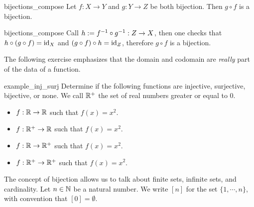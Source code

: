 \begin{clem}{}{bijections_compose}
    Let \( f : X \to Y \) and \( g : Y \to Z \) be both bijection. Then \( g \circ f \) is a bijection.
\end{clem}
\begin{lemproof}{bijections_compose}
    Call \( h := {f}^{-1} \circ {g}^{-1} : Z \to X \), then one checks that \( h \circ (g \circ f) = \mathrm{id}_X \) and \( (g \circ f) \circ h = \mathrm{id}_Z \), therefore \( g \circ f \) is a bijection. 
\end{lemproof}

The following exercise emphasizes that the domain and codomain are \textit{really} part of the data of a function.
\begin{cex}{}{example_inj_surj}
    Determine if the following functions are injective, surjective, bijective, or none. We call \( \mathbb{R}^+ \) the set of real numbers greater or equal to \( 0 \).
    \begin{itemize}
        \item \( f : \mathbb{R} \to \mathbb{R} \) such that \( f(x) = x^2 \).
        \item \( f : \mathbb{R}^+ \to \mathbb{R} \) such that \( f(x) = x^2 \).
        \item \( f : \mathbb{R} \to \mathbb{R}^+ \) such that \( f(x) = x^2 \).
        \item \( f : \mathbb{R}^+ \to \mathbb{R}^+ \) such that \( f(x) = x^2 \).
    \end{itemize}
\end{cex}


The concept of bijection allows us to talk about finite sets, infinite sets, and cardinality. Let \( n \in \mathbb{N} \) be a natural number. We write \( [n] \) for the set \( \{ 1, \cdots, n \} \), with convention that \( [0] = \emptyset \).

